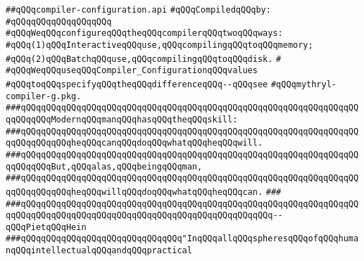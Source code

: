 \label{src/lib/compiler/toplevel/main/compiler-configuration.api}
\verb|##qQQqcompiler-configuration.api|\newline
\newline
\verb|#qQQqCompiledqQQqby:|\newline
\verb|#qQQqqQQqqQQqqQQqqQQq|\newline
\newline
\newline
\newline
\verb|#qQQqWeqQQqconfigureqQQqtheqQQqcompilerqQQqtwoqQQqways:|\newline
\verb|#qQQq(1)qQQqInteractiveqQQquse,qQQqcompilingqQQqtoqQQqmemory;|\newline
\verb|#qQQq(2)qQQqBatchqQQquse,qQQqcompilingqQQqtoqQQqdisk.|\newline
\verb|#|\newline
\verb|#qQQqWeqQQquseqQQqCompiler_ConfigurationqQQqvalues|\newline
\verb|#qQQqtoqQQqspecifyqQQqtheqQQqdifferenceqQQq--qQQqsee|\newline
\verb|#qQQqmythryl-compiler-g.pkg.|\newline
\newline
\newline
\newline
\verb|###qQQqqQQqqQQqqQQqqQQqqQQqqQQqqQQqqQQqqQQqqQQqqQQqqQQqqQQqqQQqqQQqqQQqqQQqqQQqModernqQQqmanqQQqhasqQQqtheqQQqskill:|\newline
\verb|###qQQqqQQqqQQqqQQqqQQqqQQqqQQqqQQqqQQqqQQqqQQqqQQqqQQqqQQqqQQqqQQqqQQqqQQqqQQqqQQqheqQQqcanqQQqdoqQQqwhatqQQqheqQQqwill.|\newline
\verb|###qQQqqQQqqQQqqQQqqQQqqQQqqQQqqQQqqQQqqQQqqQQqqQQqqQQqqQQqqQQqqQQqqQQqqQQqqQQqBut,qQQqalas,qQQqbeingqQQqman,|\newline
\verb|###qQQqqQQqqQQqqQQqqQQqqQQqqQQqqQQqqQQqqQQqqQQqqQQqqQQqqQQqqQQqqQQqqQQqqQQqqQQqqQQqheqQQqwillqQQqdoqQQqwhatqQQqheqQQqcan.|\newline
\verb|###|\newline
\verb|###qQQqqQQqqQQqqQQqqQQqqQQqqQQqqQQqqQQqqQQqqQQqqQQqqQQqqQQqqQQqqQQqqQQqqQQqqQQqqQQqqQQqqQQqqQQqqQQqqQQqqQQqqQQqqQQqqQQqqQQq--qQQqPietqQQqHein|\newline
\newline
\newline
\newline
\verb|###qQQqqQQqqQQqqQQqqQQqqQQqqQQqqQQq"InqQQqallqQQqspheresqQQqofqQQqhumanqQQqintellectualqQQqandqQQqpractical|\newline
